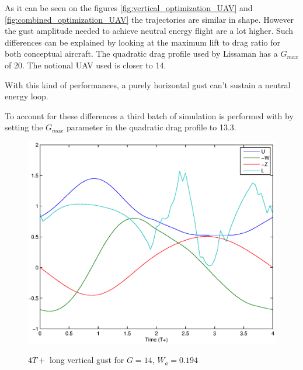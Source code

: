 As it can be seen on the figures \ref{fig:vertical_optimization_UAV} and \ref{fig:combined_optimization_UAV} the trajectories are similar in shape. However the gust amplitude needed to achieve neutral energy flight are a lot higher.
Such differences can be explained by looking at the maximum lift to drag ratio for both conceptual aircraft.
The quadratic drag profile used by Lissaman has a $G_{max}$ of 20.
The notional UAV used is closer to 14.

\FloatBarrier

\par With this kind of performances, a purely horizontal gust can't sustain a neutral energy loop.


\par To account for these differences a third batch of simulation is performed with by setting the $G_{max}$ parameter in the quadratic drag profile to 13.3.

\begin{figure}[ht]
	\begin{center}
		\scalebox{0.8}
		{\includegraphics{./Figures/Windtype=1_Tg=4_Wg=0p194_quad_G=13.eps}}
	\end{center}
	\caption{$4T+$ long vertical gust for $G=14$, $W_a=0.194$}
	\label{fig:vertical_optimization_UAV_modified}
\end{figure}


